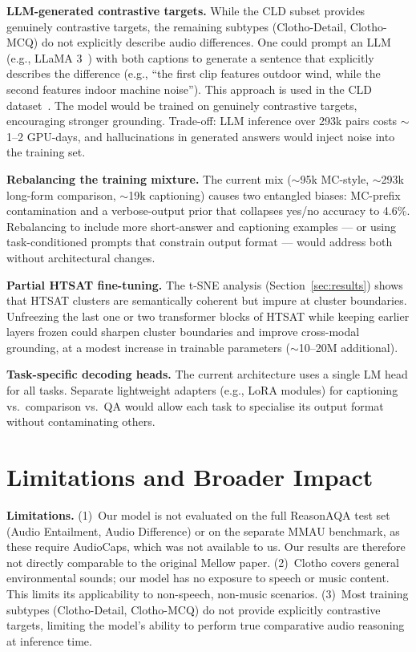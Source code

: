 \documentclass[cameraready]{Interspeech}
\begin{document}
\textbf{LLM-generated contrastive targets.} While the CLD subset provides genuinely contrastive targets, the remaining subtypes (Clotho-Detail, Clotho-MCQ) do not explicitly describe audio differences. One could prompt an LLM (e.g., LLaMA 3~\cite{dubey2024llama}) with both captions to generate a sentence that explicitly describes the difference (e.g., ``the first clip features outdoor wind, while the second features indoor machine noise''). This approach is used in the CLD dataset~\cite{deshmukh2025adiff}. The model would be trained on genuinely contrastive targets, encouraging stronger grounding. Trade-off: LLM inference over 293k pairs costs $\sim$1--2 GPU-days, and hallucinations in generated answers would inject noise into the training set.

\textbf{Rebalancing the training mixture.} The current mix ($\sim$95k MC-style,
$\sim$293k long-form comparison, $\sim$19k captioning) causes two entangled biases: MC-prefix
contamination and a verbose-output prior that collapses yes/no accuracy to 4.6\%.
Rebalancing to include more short-answer and captioning examples — or using task-conditioned
prompts that constrain output format — would address both without architectural changes.

\textbf{Partial HTSAT fine-tuning.} The t-SNE analysis (Section~\ref{sec:results}) shows that
HTSAT clusters are semantically coherent but impure at cluster boundaries. Unfreezing the last
one or two transformer blocks of HTSAT while keeping earlier layers frozen could sharpen
cluster boundaries and improve cross-modal grounding, at a modest increase in trainable
parameters ($\sim$10--20M additional).

\textbf{Task-specific decoding heads.} The current architecture uses a single LM head for all
tasks. Separate lightweight adapters (e.g., LoRA modules) for captioning vs.\ comparison
vs.\ QA would allow each task to specialise its output format without contaminating others.

\section{Limitations and Broader Impact}
\label{sec:limitations}

\textbf{Limitations.}
(1)~Our model is not evaluated on the full ReasonAQA test set (Audio Entailment, Audio Difference) or on the separate MMAU benchmark, as these require AudioCaps, which was not available to us.
Our results are therefore not directly comparable to the original Mellow paper.
(2)~Clotho covers general environmental sounds; our model has no exposure to speech or music
content. This limits its applicability to non-speech, non-music scenarios.
(3)~Most training subtypes (Clotho-Detail, Clotho-MCQ) do not provide explicitly contrastive targets, limiting the model's ability to perform true comparative audio reasoning at inference time.
\end{document}

